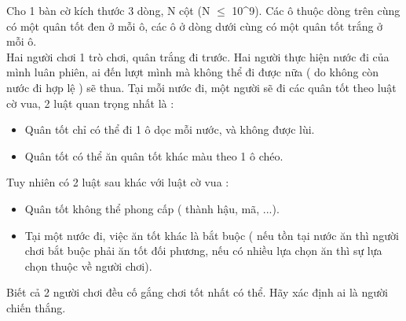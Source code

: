 Cho 1 bàn cờ kích thước 3 dòng, N cột (N $\le$ 10^9). Các ô thuộc dòng trên cùng có một quân tốt đen ở mỗi ô, các ô ở dòng dưới cùng có một quân tốt trắng ở mỗi ô.
\\Hai người chơi 1 trò chơi, quân trắng đi trước. Hai người thực hiện nước đi của mình luân phiên, ai đến lượt mình mà không thể đi được nữa ( do không còn nước đi hợp lệ ) sẽ thua. Tại mỗi nước đi, một người sẽ đi các quân tốt theo luật cờ vua, 2 luật quan trọng nhất là :
\begin{itemize}
	\item Quân tốt chỉ có thể đi 1 ô dọc mỗi nước, và không được lùi.
	\item Quân tốt có thể ăn quân tốt khác màu theo 1 ô chéo.
\end{itemize}

Tuy nhiên có 2 luật sau khác với luật cờ vua :
\begin{itemize}
	\item Quân tốt không thể phong cấp ( thành hậu, mã, ...).
	\item Tại một nước đi, việc ăn tốt khác là bắt buộc ( nếu tồn tại nước ăn thì người chơi bắt buộc phải ăn tốt đối phương, nếu có nhiều lựa chọn ăn thì sự lựa chọn thuộc về người chơi).
\end{itemize}

Biết cả 2 người chơi đều cố gắng chơi tốt nhất có thể. Hãy xác định ai là người chiến thắng.